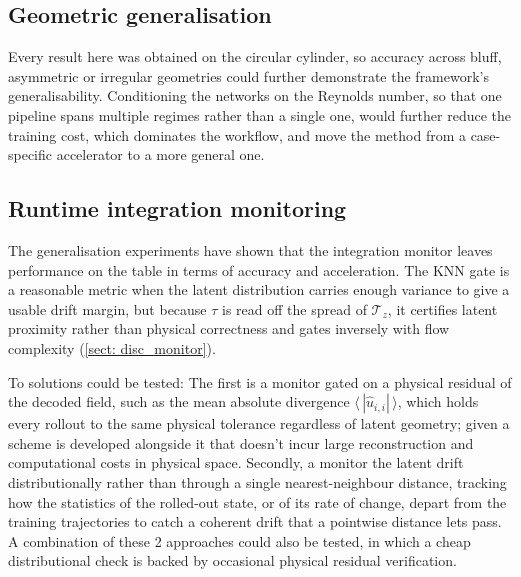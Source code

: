 \subsection{Geometric  generalisation}
Every result here was obtained on the circular cylinder, so accuracy across bluff, asymmetric or irregular geometries could further demonstrate the framework's generalisability. Conditioning the networks on the Reynolds number, so that one pipeline spans multiple regimes rather than a single one, would further reduce the training cost, which dominates the workflow, and move the method from a case-specific accelerator to a more general one. 

\subsection{Runtime integration monitoring}

The generalisation experiments have shown that the integration monitor leaves performance on the table in terms of accuracy and acceleration. The KNN gate is a reasonable metric when the latent distribution carries enough variance to give a usable drift margin, but because $\tau$ is read off the spread of $\boldsymbol{\mathcal{T}}_z$, it certifies latent proximity rather than physical correctness and gates inversely with flow complexity (\autoref{sect: disc_monitor}).

To solutions could be tested: The first is a monitor gated on a physical residual of the decoded field, such as the mean absolute divergence $\langle\,|\hat{u}_{i,i}|\,\rangle$, which holds every rollout to the same physical tolerance regardless of latent geometry; given a scheme is developed alongside it that doesn't incur large reconstruction and computational costs in physical space. Secondly, a monitor the latent drift distributionally rather than through a single nearest-neighbour distance, tracking how the statistics of the rolled-out state, or of its rate of change, depart from the training trajectories to catch a coherent drift that a pointwise distance lets pass. A combination of these 2 approaches could also be tested, in which a cheap distributional check is backed by occasional physical residual verification.  

